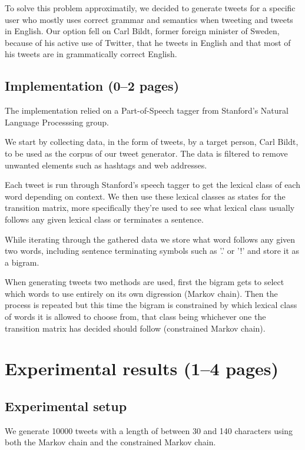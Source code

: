 \documentclass[a4paper,12pt]{article}
\begin{document}
To solve this problem approximatily, we decided to generate tweets for a specific user who mostly uses correct grammar and semantics when tweeting and tweets in English.
Our option fell on Carl Bildt, former foreign minister of Sweden, because of his active use of Twitter, 
that he tweets in English and that most of his tweets are in grammatically correct English.

\subsection{Implementation (0--2 pages)}
\label{sec:impl}
The implementation relied on a Part-of-Speech tagger from Stanford's Natural Language Processsing group.

We start by collecting data, in the form of tweets, by a target person, Carl Bildt, to be used as the corpus of our tweet generator. The data is filtered to remove unwanted elements such as hashtags and web addresses.

Each tweet is run through Stanford's speech tagger to get the lexical class of each word depending on context.
We then use these lexical classes as states for the transition matrix, more specifically they're used to see what lexical class usually follows any given lexical class or terminates a sentence.

While iterating through the gathered data we store what word follows any given two words, including sentence terminating symbols such as '.' or '!' and store it as a bigram.

When generating tweets two methods are used, first the bigram gets to select which words to use entirely on its own digression (Markov chain). Then the process is repeated but this time the bigram is constrained by which lexical class of words it is allowed to choose from, that class being whichever one the transition matrix has decided should follow (constrained Markov chain).

\section{Experimental results (1--4 pages)}
\label{sec:exps}

\subsection{Experimental setup}
We generate 10000 tweets with a length of between 30 and 140 characters using both the Markov chain and the constrained Markov chain.
\end{document}
